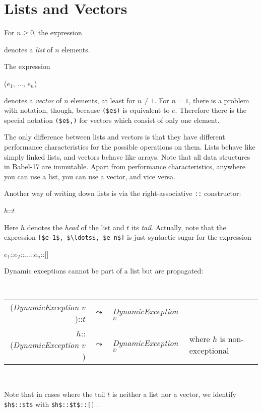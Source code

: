 \documentclass[11pt]{amsart}
\newcommand{\metababel}[1] {\textsl{#1}}
\newenvironment{babelcode}[0]{\begin{center}\tt}{\end{center}}
\newcommand{\babelsrc}[1] {\lstinline!#1!}
\begin{document}
\section{Lists and Vectors}
For $n \ge 0$, the expression
\begin{babellisting}
[$e_1$, $\ldots$, $e_n$]
\end{babellisting}
denotes a \emph{list} of $n$ elements. 

The expression
\begin{babellisting}
($e_1$, $\ldots$, $e_n$)
\end{babellisting}
denotes a  \emph{vector} of $n$ elements, at least for $n \neq 1$. 
For $n=1$, there is a problem with notation, though, because \babelsrc{($e$)}  is equivalent to $e$. Therefore there is the special notation \babelsrc{($e$,)} for vectors which consist of only one element.

The only difference between lists and vectors is that they have different performance characteristics for the possible operations on them. Lists behave like simply linked lists, and vectors behave like arrays. Note that all data structures in Babel-17 are immutable. Apart from performance characteristics, anywhere you can use a list, you can use a vector, and vice versa. 

Another way of writing down lists is via the right-associative \babelsrc{::} constructor:
\begin{babellisting}
$h$::$t$
\end{babellisting}
Here $h$ denotes the \emph{head} of the list and $t$ its \emph{tail}. Actually, note that the expression \babelsrc{[$e_1$, $\ldots$, $e_n$]} is just syntactic sugar for the expression
\begin{babellisting}
$e_1$::$e_2$::$\ldots$::$e_n$::[]
\end{babellisting}
Dynamic exceptions cannot be part of a list but are propagated:
\begin{babelcode}
\begin{tabular}{rcll}
(\metababel{DynamicException $v$})::$t$ & $\leadsto$ & \metababel{DynamicException $v$}&\\
$h$::(\metababel{DynamicException $v$}) & $\leadsto$ & \metababel{DynamicException $v$}& {\rm where $h$ is non-exceptional}\\
\end{tabular}\\
\end{babelcode}
Note that in cases where the tail $t$ is neither a list nor a vector, we identify \babelsrc{$h$::$t$} with  \babelsrc{$h$::$t$::[]} . 
\end{document}
